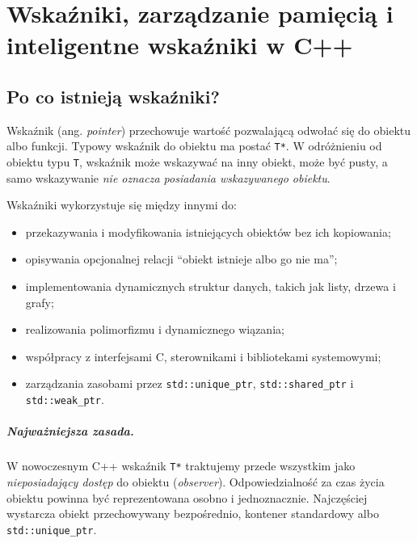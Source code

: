 % 

\chapter[Wskaźniki i inteligentne wskaźniki w C++]{Wskaźniki, zarządzanie pamięcią i inteligentne wskaźniki w C++}
\label{chap:wskazniki-cpp}

\section{Po co istnieją wskaźniki?}

Wskaźnik (ang. \emph{pointer}) przechowuje wartość pozwalającą
odwołać się do obiektu albo funkcji. Typowy wskaźnik do obiektu ma
postać \texttt{T*}. W odróżnieniu od obiektu typu \texttt{T},
wskaźnik może wskazywać na inny obiekt, może być pusty, a samo
wskazywanie \emph{nie oznacza posiadania wskazywanego obiektu}.

Wskaźniki wykorzystuje się między innymi do:
\begin{itemize}
    \item przekazywania i modyfikowania istniejących obiektów bez ich kopiowania;
    \item opisywania opcjonalnej relacji ``obiekt istnieje albo go nie ma'';
    \item implementowania dynamicznych struktur danych, takich jak listy,
    drzewa i grafy;
    \item realizowania polimorfizmu i dynamicznego wiązania;
    \item współpracy z interfejsami C, sterownikami i bibliotekami systemowymi;
    \item zarządzania zasobami przez \texttt{std::unique\_ptr},
    \texttt{std::shared\_ptr} i \texttt{std::weak\_ptr}.
\end{itemize}

\paragraph{Najważniejsza zasada.}
W nowoczesnym C++ wskaźnik \texttt{T*} traktujemy przede wszystkim
jako \emph{nieposiadający dostęp} do obiektu (\emph{observer}).
Odpowiedzialność za czas życia obiektu powinna być reprezentowana
osobno i jednoznacznie. Najczęściej wystarcza obiekt przechowywany
bezpośrednio, kontener standardowy albo \texttt{std::unique\_ptr}.

